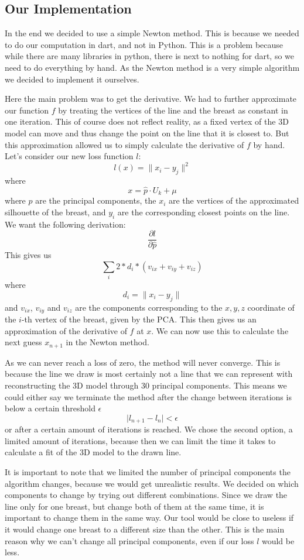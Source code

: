 \subsection{Our Implementation}\label{sec:implementation}

In the end we decided to use a simple Newton method. This is because we needed to do our computation in dart, and not in Python. This is a problem because while there are many
libraries in python, there is next to nothing for dart, so we need to do everything by hand. As the Newton method is a very simple algorithm we decided to implement it ourselves.

Here the main problem was to get the derivative. We had to further approximate our function $f$ by treating the vertices of the line and the breast as constant in one iteration. This of course does not
reflect reality, as a fixed vertex of the 3D model can move and thus change the point on the line that it is closest to. But this approximation allowed us to simply calculate the derivative of $f$ by hand.
Let's consider our new loss function $l$:
\[
    l(x) = \lVert x_i - y_j \rVert^2
\]
where 
\[
    x = \hat{p} \cdot U_k + \mu
\]
where $\hat{p}$ are the principal components, the $x_i$ are the vertices of the approximated silhouette of the breast, and $y_i$ are the corresponding closest points on the line. We want the following derivation:
\[
    \frac{\partial l}{\partial \hat{p}}
\]
This gives us
\[
    \sum_{i}{} 2 * d_i * (v_{ix} + v_{iy} + v_{iz})
\]
where
\[
    d_i = \lVert x_i - y_j \rVert
\]
and $v_{ix}$, $v_{iy}$ and $v_{iz}$ are the components corresponding to the $x,y,z$ coordinate of the $i$-th vertex of the breast, given by the PCA. This then gives us an approximation of the derivative of $f$ at $x$.
We can now use this to calculate the next guess $x_{n+1}$ in the Newton method. 

As we can never reach a loss of zero, the method will never converge. This is because the line we draw is most
certainly not a line that we can represent with reconstructing the 3D model through 30 principal components. This means we could either say we terminate the method after the change between
iterations is below a certain threshold $\epsilon$
\[
    \lvert l_{n+1} - l_n \rvert < \epsilon  
\]
or after a certain amount of iterations is reached. We chose the second option, a limited amount of iterations, because then we can limit the time it takes to calculate a fit of the 3D model
to the drawn line. 

It is important to note that we limited the number of principal components the algorithm changes, because we would get unrealistic results. We decided on which components to 
change by trying out different combinations. Since we draw the line only for one breast, but change both of them at the same time, it is important to change them in the same way. Our tool would be close to useless
if it would change one breast to a different size than the other. This is the main reason why we can't change all principal components, even if our loss $l$ would be less. 

